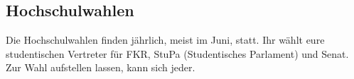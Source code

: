 \subsection{Hochschulwahlen}
Die Hochschulwahlen finden jährlich, meist im Juni, statt. Ihr wählt eure 
studentischen Vertreter für FKR, StuPa (Studentisches Parlament) und Senat.
Zur Wahl aufstellen lassen, kann sich jeder.